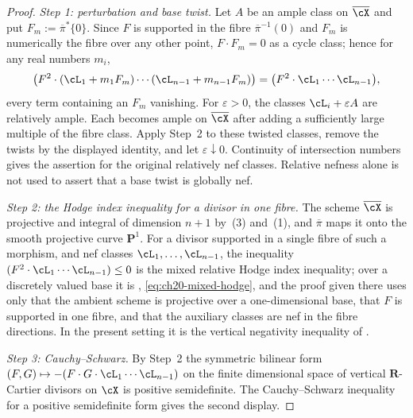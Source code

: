 \begin{proof}
\emph{Step 1: perturbation and base twist.}  Let $A$ be an ample class on
$\overline\cX$ and put $F_m:=\overline\pi^*\{0\}$.  Since $F$ is
supported in the fibre $\overline\pi^{-1}(0)$ and $F_m$ is numerically
the fibre over any other point, $F\cdot F_m=0$ as a cycle class; hence
for any real numbers $m_i$,
\[
 \bigl(F^2\cdot(\cL_1+m_1F_m)\cdots(\cL_{n-1}+m_{n-1}F_m)\bigr)
 =\bigl(F^2\cdot\cL_1\cdots\cL_{n-1}\bigr),
\]
every term containing an $F_m$ vanishing. For $\varepsilon>0$, the
classes $\cL_i+\varepsilon A$ are relatively ample. Each becomes ample
on $\overline\cX$ after adding a sufficiently large multiple of the
fibre class. Apply Step~2 to these twisted classes, remove the twists by
the displayed identity, and let $\varepsilon\downarrow0$. Continuity of
intersection numbers gives the assertion for the original relatively nef
classes. Relative nefness alone is not used to assert that a base twist
is globally nef.

\emph{Step 2: the Hodge index inequality for a divisor in one fibre.}  The
scheme $\overline\cX$ is projective and integral of dimension $n+1$ by
\,(3) and
\,(1), and $\overline\pi$ maps it onto
the smooth projective curve $\mathbf P^1$.  For a divisor supported in a
single fibre of such a morphism, and nef classes
$\cL_1,\dots,\cL_{n-1}$, the inequality
$(F^2\cdot\cL_1\cdots\cL_{n-1})\le0$ is the mixed relative Hodge index
inequality; over a discretely valued base it is
, \eqref{eq:ch20-mixed-hodge}, and the proof
given there uses only that the ambient scheme is projective over a
one-dimensional base, that $F$ is supported in one fibre, and that the
auxiliary classes are nef in the fibre directions.  In the present setting
it is the vertical negativity inequality of \cite[Lemma~3.24]{BJ22}.

\emph{Step 3: Cauchy--Schwarz.}  By Step~2 the symmetric bilinear form
$(F,G)\mapsto-(F\cdot G\cdot\cL_1\cdots\cL_{n-1})$ on the finite
dimensional space of vertical $\mathbf R$-Cartier divisors on $\cX$ is
positive semidefinite.  The Cauchy--Schwarz inequality for a positive
semidefinite form gives the second display.
\end{proof}

